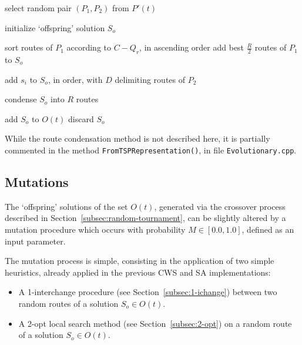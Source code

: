 \begin{algorithmic}[1]


    \Repeat
        \State select random pair $(P_1,P_2)$ from $P'(t)$

    \State initialize `offspring' solution $S_o$

    \State sort routes of $P_1$ according to $C - Q_r$, 
    \Statex[2] in ascending order
    \State add best $\frac{R}{2}$ routes of $P_1$ to $S_o$

                \State add $s_i$ to $S_o$, in order, 
                \Statex[5] with $D$ delimiting routes of $P_2$
            \EndIf
        \EndFor
    \EndFor

        \State condense $S_o$ into $R$ routes
    \EndIf

        \State add $S_o$ to $O(t)$
    \Else
        \State discard $S_o$
    \EndIf

\EndWhile

\end{algorithmic}\vertbreak

While the route condensation method is not described here, it is partially commented 
in the method \verb+FromTSPRepresentation()+, in file \verb+Evolutionary.cpp+.\vertbreak

\subsection{Mutations}
\label{subsec:mutations}

The `offspring' solutions of the set $O(t)$, generated via the crossover 
process described in Section~\ref{subsec:random-tournament}, can be slightly 
altered by a mutation procedure which occurs with probability 
$M \in [0.0, 1.0]$, defined as an input parameter.\vertbreak 

The mutation process is 
simple, consisting in the application of two simple heuristics, already 
applied in the previous CWS and SA implementations: 

\begin{itemize}
    \item A 1-interchange procedure (see Section~\ref{subsec:1-ichange}) between two random routes of a solution 
        $S_o \in O(t)$.
    \item A 2-opt local search method (see Section~\ref{subsec:2-opt}) on a random route 
        of a solution $S_o \in O(t)$.
\end{itemize}


